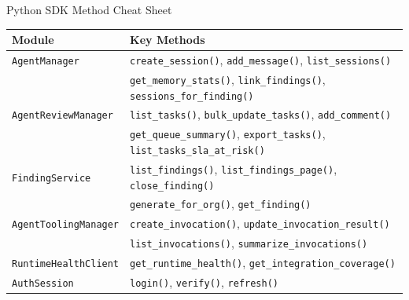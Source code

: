 \documentclass[aspectratio=169]{beamer}
\begin{document}
\begin{frame}{Python SDK Method Cheat Sheet}
\scriptsize
\begin{tabular}{ll}
\toprule
\textbf{Module} & \textbf{Key Methods} \\
\midrule
\texttt{AgentManager} & \texttt{create\_session()}, \texttt{add\_message()}, \texttt{list\_sessions()} \\
 & \texttt{get\_memory\_stats()}, \texttt{link\_findings()}, \texttt{sessions\_for\_finding()} \\
\midrule
\texttt{AgentReviewManager} & \texttt{list\_tasks()}, \texttt{bulk\_update\_tasks()}, \texttt{add\_comment()} \\
 & \texttt{get\_queue\_summary()}, \texttt{export\_tasks()}, \texttt{list\_tasks\_sla\_at\_risk()} \\
\midrule
\texttt{FindingService} & \texttt{list\_findings()}, \texttt{list\_findings\_page()}, \texttt{close\_finding()} \\
 & \texttt{generate\_for\_org()}, \texttt{get\_finding()} \\
\midrule
\texttt{AgentToolingManager} & \texttt{create\_invocation()}, \texttt{update\_invocation\_result()} \\
 & \texttt{list\_invocations()}, \texttt{summarize\_invocations()} \\
\midrule
\texttt{RuntimeHealthClient} & \texttt{get\_runtime\_health()}, \texttt{get\_integration\_coverage()} \\
\midrule
\texttt{AuthSession} & \texttt{login()}, \texttt{verify()}, \texttt{refresh()} \\
\bottomrule
\end{tabular}
\end{frame}
\end{document}
